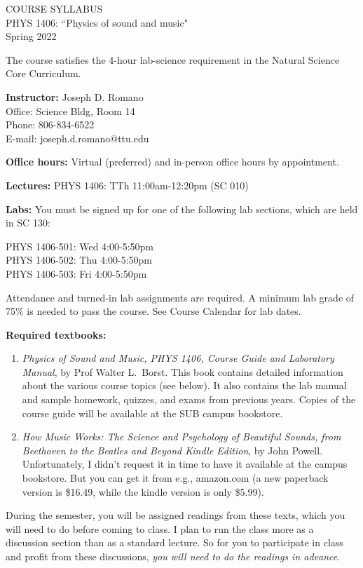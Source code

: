 \documentclass[11pt]{NSF}
\def\ben{\begin{enumerate}}
\def\een{\end{enumerate}}
\begin{document}
\begin{center}
COURSE SYLLABUS\\
PHYS 1406: ``Physics of sound and music"\\
Spring 2022
\end{center}

The course satisfies the 4-hour lab-science requirement in the Natural Science Core Curriculum.

{\bf Instructor:}
Joseph D. Romano\\
Office: Science Bldg, Room 14\\
Phone: 806-834-6522\\
E-mail: joseph.d.romano@ttu.edu

{\bf Office hours:}
Virtual (preferred) and in-person office hours by appointment.

{\bf Lectures:}
PHYS 1406: TTh 11:00am-12:20pm (SC 010)

{\bf Labs:} You must be signed up for one of the following lab
sections, which are held in SC 130:

PHYS 1406-501: Wed 4:00-5:50pm\\
PHYS 1406-502: Thu 4:00-5:50pm\\
PHYS 1406-503: Fri 4:00-5:50pm

Attendance and turned-in lab assignments are required.
A minimum lab grade of 75\% is needed to pass the course.
See Course Calendar for lab dates.

{\bf Required textbooks:}
\ben

\item 
{\em Physics of Sound and Music, PHYS 1406, 
Course Guide and Laboratory Manual}, by Prof Walter L.~Borst.
This book contains detailed information about the various course
topics (see below).
It also contains the lab manual and sample homework, quizzes, and exams
from previous years. 
Copies of the course guide will be available at the SUB campus bookstore.

\item
{\em How Music Works: The Science and Psychology of Beautiful Sounds, 
from Beethoven to the Beatles and Beyond Kindle Edition}, by John Powell.
Unfortunately, I didn't request it in time to have it available at 
the campus bookstore.  
But you can get it from e.g., amazon.com (a new paperback version is 
\$16.49, while the kindle version is only \$5.99).

\een

During the semester, you will be assigned readings from these texts, which you
will need to do before coming to class.  
I plan to run the class more as a discussion section than as a standard lecture.  
So for you to participate in class and profit from these discussions, 
{\em you will need to do the readings in advance}.
\end{document}
